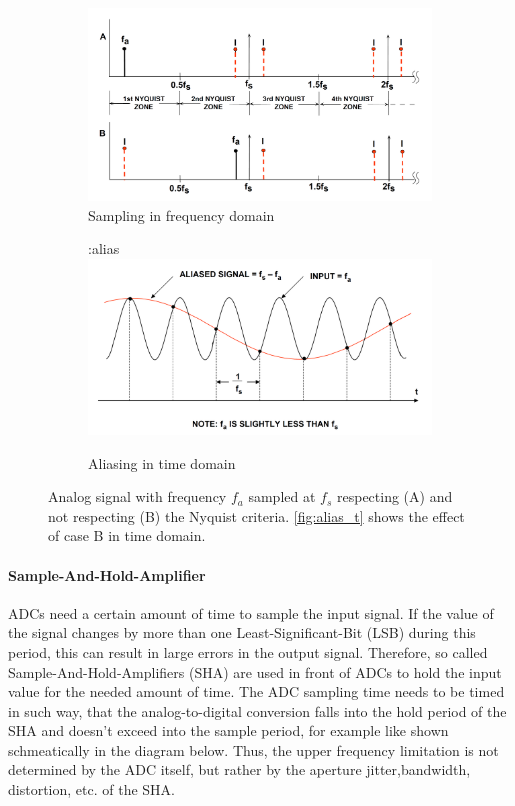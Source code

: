 \begin{figure}[H]
	\centering
	\begin{subfigure}{\textwidth}
	\centering
	\includegraphics[width=.6\linewidth]{chap/02-theory/img/alias_f}  
	\caption{Sampling in frequency domain}
	\label{fig:alias_f}
	\end{subfigure}
	\begin{subfigure}{\textwidth}
	\centering
:alias	\includegraphics[width=.6\linewidth]{chap/02-theory/img/alias_t}  
	\caption{Aliasing in time domain}
	\label{fig:alias_t}
	\end{subfigure}
	\caption{Analog signal with frequency $f_a$ sampled at $f_s$ respecting (A) and not respecting (B) the Nyquist criteria. \autoref{fig:alias_t} shows the effect of case B in time domain. \cite{walt}}
\end{figure}


\paragraph{Sample-And-Hold-Amplifier}
ADCs need a certain amount of time to sample the input signal. If the value of the signal changes by more than one Least-Significant-Bit (LSB) during this period, this can result in large errors in the output signal. Therefore, so called Sample-And-Hold-Amplifiers (SHA) are used in front of ADCs to hold the  input value for the needed amount of time. The ADC sampling time needs to be timed in such way, that the analog-to-digital conversion falls into the hold period of the SHA and doesn't exceed into the sample period, for example like shown schmeatically in the diagram below. Thus, the upper frequency limitation is not determined by the ADC itself, but rather by the aperture jitter,bandwidth, distortion, etc. of the SHA. \cite{walt}



